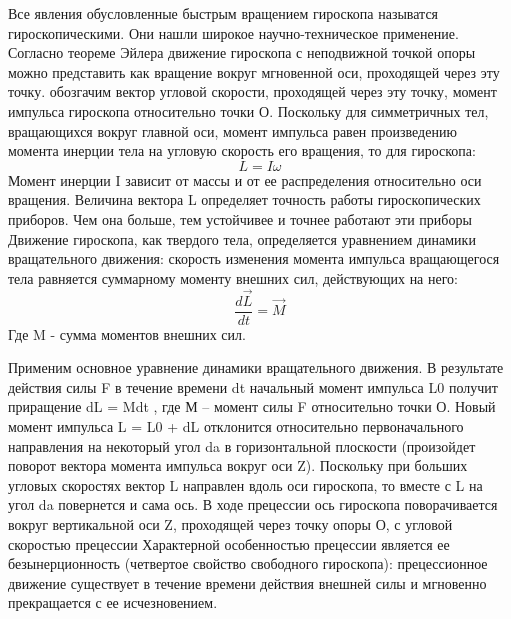 \documentclass[a4paper, 12pt]{article}
\begin{document}
Все явления обусловленные быстрым вращением гироскопа называтся гироскопическими. Они нашли широкое научно-техническое применение.\newline
Согласно теореме Эйлера движение гироскопа с неподвижной точкой опоры можно представить как вращение вокруг мгновенной оси, проходящей через эту точку. обозгачим вектор угловой скорости, проходящей через эту точку, момент импульса гироскопа относительно точки О. Поскольку для симметричных тел, вращающихся вокруг главной оси, момент импульса равен произведению момента инерции тела на
угловую скорость его вращения, то для гироскопа:
\begin{equation}
		L = I \omega
\end{equation}
Момент инерции I
зависит от массы и от ее распределения относительно оси вращения.
Величина вектора L определяет точность работы гироскопических приборов.
Чем она больше, тем устойчивее и точнее работают эти приборы
Движение гироскопа, как твердого тела, определяется уравнением
динамики вращательного движения: скорость изменения момента импульса
вращающегося тела равняется суммарному моменту внешних сил,
действующих на него:
\begin{equation}
		\label{Torque}
		\frac{d \vec{L}}{dt} = \vec{M}
\end{equation}
Где M - сумма моментов внешних сил.

Применим основное уравнение
динамики вращательного движения. В результате действия силы F в
течение времени dt начальный момент импульса L0 получит приращение
dL = Mdt
, где М – момент силы F относительно точки О. Новый момент
импульса
L = L0 + dL
отклонится относительно первоначального
направления на некоторый угол da в горизонтальной плоскости (произойдет
поворот вектора момента импульса вокруг оси Z). Поскольку при больших
угловых скоростях вектор L направлен вдоль оси гироскопа, то вместе с L
на угол da повернется и сама ось.\newline
В ходе прецессии ось гироскопа поворачивается вокруг вертикальной
оси Z, проходящей через точку опоры О, с угловой скоростью прецессии
Характерной особенностью прецессии является ее безынерционность
(четвертое свойство свободного гироскопа): прецессионное движение
существует в течение времени действия внешней силы и мгновенно
прекращается с ее исчезновением.
\end{document}
